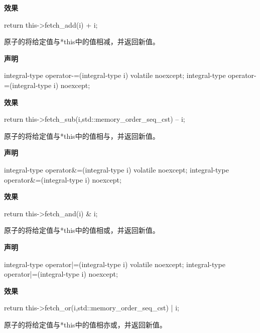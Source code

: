\textbf{效果}

\begin{cpp}
return this->fetch_add(i) + i;
\end{cpp}


原子的将给定值与*this中的值相减，并返回新值。

\textbf{声明}

\begin{cpp}
integral-type operator-=(integral-type i) volatile noexcept;
integral-type operator-=(integral-type i) noexcept;
\end{cpp}

\textbf{效果}

\begin{cpp}
return this->fetch_sub(i,std::memory_order_seq_cst) – i;
\end{cpp}


原子的将给定值与*this中的值相与，并返回新值。

\textbf{声明}

\begin{cpp}
integral-type operator&=(integral-type i) volatile noexcept;
integral-type operator&=(integral-type i) noexcept;
\end{cpp}

\textbf{效果}

\begin{cpp}
return this->fetch_and(i) & i;
\end{cpp}


原子的将给定值与*this中的值相或，并返回新值。

\textbf{声明}

\begin{cpp}
integral-type operator|=(integral-type i) volatile noexcept;
integral-type operator|=(integral-type i) noexcept;
\end{cpp}

\textbf{效果}

\begin{cpp}
return this->fetch_or(i,std::memory_order_seq_cst) | i;
\end{cpp}


原子的将给定值与*this中的值相亦或，并返回新值。

